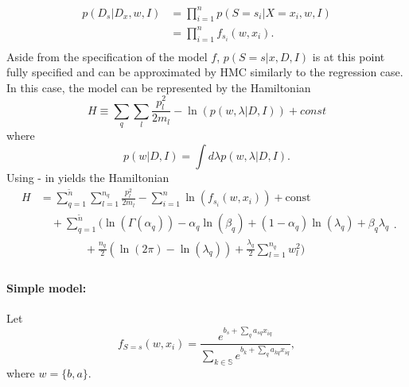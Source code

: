 \begin{example}
	\begin{equation}
		\begin{split}
			p(D_s|D_x,w,I) &=\prod_{i=1}^{n}p(S = s_i|X = x_i,w,I)\\
			&=\prod_{i=1}^{n}f_{s_i}(w,x_i).\\
		\end{split}
		\label{lika}
	\end{equation}
	Aside from the specification of the model $f$, $p(S= s|x,D,I)$ is at this point fully specified and can be approximated by HMC similarly to the regression case. In this case, the model can be represented by the Hamiltonian 
	\begin{equation}
		H \equiv  \sum_{q}\sum_{l}\frac{p_{l}^2}{2m_{l}}-\ln(p(w,\lambda|D,I))+const
		\label{ham3a}
	\end{equation}
	where
	\begin{equation}
		p(w|D,I) = \int d\lambda p(w,\lambda|D,I).
	\end{equation}
	Using - in  yields the Hamiltonian
	\begin{equation}
		\begin{split}
			H&=\sum_{q=1}^{\tilde{n}}\sum_{l=1}^{n_q}\frac{p_{l}^2}{2m_{l}}-\sum_{i=1}^{n}\ln(f_{s_i}(w,x_i))+\text{const}\\
			&\quad+\sum_{q=1}^{\tilde{n}}\bigg(\ln(\Gamma(\alpha_q))-\alpha_q\ln(\beta_q)+(1-\alpha_q)\ln(\lambda_q)+\beta_q\lambda_q\\
			&\qquad \qquad+\frac{n_q}{2}(\ln(2\pi)-\ln(\lambda_q))+\frac{\lambda_q}{2}\sum_{l=1}^{n_q}w_l^2\bigg)\\
		\end{split}.
		\label{ham2a}
	\end{equation}
	
	\paragraph{Simple model:} Let
	\begin{equation}
		f_{S = s}(w,x_i) = \frac{e^{b_s+\sum_{q}a_{sq}x_{iq}}}{\sum_{k\in \mathbb{S}}e^{b_k+\sum_{q}a_{kq}x_{iq}}},
		\label{eq:f1}
	\end{equation}
	where $w = \{b,a\}$.
	

\end{example}
